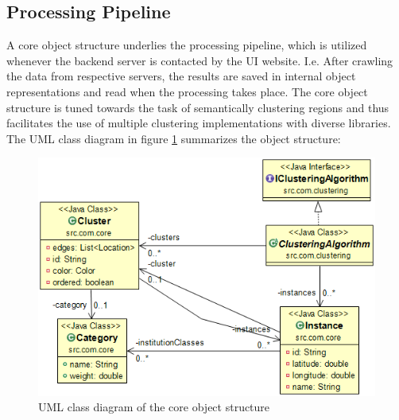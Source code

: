 \subsection{Processing Pipeline}
A core object structure underlies the processing pipeline, which is utilized whenever the backend server is contacted by the UI website. I.e. After crawling the data from respective servers, the results are saved in internal object representations and read when the processing takes place. The core object structure is tuned towards the task of semantically clustering regions and thus facilitates the use of multiple clustering implementations with diverse libraries. The UML class diagram in figure \ref{fig:cos} summarizes the object structure:
 
\begin{figure}
  \centering
    \includegraphics[scale=0.7]{./content/cos.png}
  \caption{UML class diagram of the core object structure}\label{fig:cos}
\end{figure}


